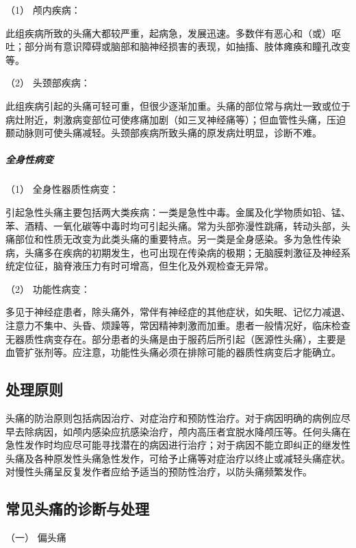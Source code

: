 \hypertarget{text00020.htmlux5cux23CHP1-7-2-2-1-1}{}
（1） 颅内疾病：

此组疾病所致的头痛大都较严重，起病急，发展迅速。多数伴有恶心和（或）呕吐；部分尚有意识障碍或脑部和脑神经损害的表现，如抽搐、肢体瘫痪和瞳孔改变等。

\hypertarget{text00020.htmlux5cux23CHP1-7-2-2-1-2}{}
（2） 头颈部疾病：

此组疾病引起的头痛可轻可重，但很少逐渐加重。头痛的部位常与病灶一致或位于病灶附近，刺激病变部位可使疼痛加剧（如三叉神经痛等）；但血管性头痛，压迫颞动脉则可使头痛减轻。头颈部疾病所致头痛的原发病灶明显，诊断不难。

\subparagraph{全身性病变}

\hypertarget{text00020.htmlux5cux23CHP1-7-2-2-2-1}{}
（1） 全身性器质性病变：

引起急性头痛主要包括两大类疾病：一类是急性中毒。金属及化学物质如铅、锰、苯、酒精、一氧化碳等中毒时均可引起头痛。常为头部弥漫性跳痛，转动头部，头痛部位和性质无改变为此类头痛的重要特点。另一类是全身感染。多为急性传染病，头痛多在疾病的初期发生，也可出现在传染病的极期；无脑膜刺激征及神经系统定位征，脑脊液压力有时可增高，但生化及外观检查无异常。

\hypertarget{text00020.htmlux5cux23CHP1-7-2-2-2-2}{}
（2） 功能性病变：

多见于神经症患者，除头痛外，常伴有神经症的其他症状，如失眠、记忆力减退、注意力不集中、头昏、烦躁等，常因精神刺激而加重。患者一般情况好，临床检查无器质性病变存在。部分患者的头痛是由于服药后所引起（医源性头痛），主要是血管扩张剂等。应注意，功能性头痛必须在排除可能的器质性病变后才能确立。

\subsection{处理原则}

头痛的防治原则包括病因治疗、对症治疗和预防性治疗。对于病因明确的病例应尽早去除病因，如颅内感染应抗感染治疗，颅内高压者宜脱水降颅压等。任何头痛在急性发作时均应尽可能寻找潜在的病因进行治疗；对于病因不能立即纠正的继发性头痛及各种原发性头痛急性发作，可给予止痛等对症治疗以终止或减轻头痛症状。对慢性头痛呈反复发作者应给予适当的预防性治疗，以防头痛频繁发作。

\subsection{常见头痛的诊断与处理}

\hypertarget{text00020.htmlux5cux23CHP1-7-4-1}{}
（一） 偏头痛

